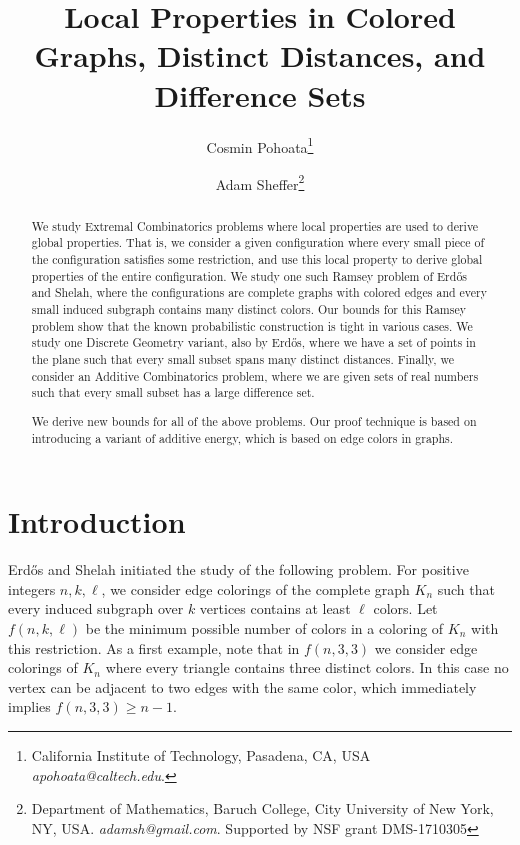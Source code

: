 \documentclass[11pt]{article}
\newcounter{problems}
\begin{document}

\title{Local Properties in Colored Graphs, Distinct Distances, and Difference Sets}

\author{
Cosmin Pohoata\thanks{California Institute of Technology, Pasadena, CA, USA
{\sl apohoata@caltech.edu}.}
\and
Adam Sheffer\thanks{Department of Mathematics, Baruch College, City University of New York, NY, USA.
{\sl adamsh@gmail.com}. Supported by NSF grant DMS-1710305}}

\maketitle

\begin{abstract}
We study Extremal Combinatorics problems where local properties are used to derive global properties.
That is, we consider a given configuration where every small piece of the configuration satisfies some restriction, and use this local property to derive global properties of the entire configuration.
We study one such Ramsey problem of Erd\H os and Shelah, where the configurations are complete graphs with colored edges and every small induced subgraph contains many distinct colors.
Our bounds for this Ramsey problem show that the known probabilistic construction is tight in various cases.
We study one Discrete Geometry variant, also by Erd\H os, where we have a set of points in the plane such that every small subset spans many distinct distances.
Finally, we consider an Additive Combinatorics problem, where we are given sets of real numbers such that every small subset has a large difference set.

We derive new bounds for all of the above problems.
Our proof technique is based on introducing a variant of additive energy, which is based on edge colors in graphs.
\end{abstract}

\section{Introduction}

Erd\H os and Shelah \cite[Section V]{Erdos74} initiated the study of the following problem.
For positive integers $n,k,\ell$, we consider edge colorings of the complete graph $K_n$ such that every induced subgraph over $k$ vertices contains at least $\ell$ colors.
Let $f(n,k,\ell)$ be the minimum possible number of colors in a coloring of $K_n$ with this restriction.
As a first example, note that in $f(n,3,3)$ we consider edge colorings of $K_n$ where every triangle contains three distinct colors.
In this case no vertex can be adjacent to two edges with the same color, which immediately implies $f(n,3,3)\ge n-1$.
\end{document}
